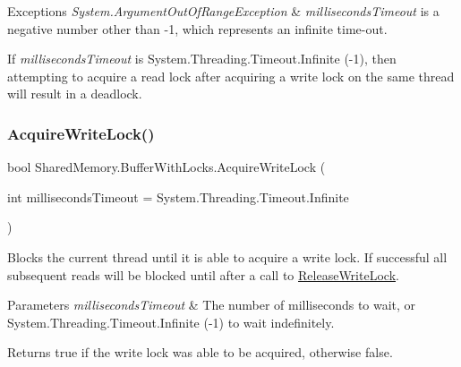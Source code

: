 \begin{DoxyExceptions}{Exceptions}
{\em System.\+Argument\+Out\+Of\+Range\+Exception} & {\itshape milliseconds\+Timeout}  is a negative number other than -\/1, which represents an infinite time-\/out.\\
\hline
\end{DoxyExceptions}


If {\itshape milliseconds\+Timeout}  is System.\+Threading.\+Timeout.\+Infinite (-\/1), then attempting to acquire a read lock after acquiring a write lock on the same thread will result in a deadlock.\mbox{\label{class_shared_memory_1_1_buffer_with_locks_a309b191c69586043c60362e401732940}} 
\subsubsection{\texorpdfstring{Acquire\+Write\+Lock()}{AcquireWriteLock()}}
{\footnotesize\ttfamily bool Shared\+Memory.\+Buffer\+With\+Locks.\+Acquire\+Write\+Lock (\begin{DoxyParamCaption}\item[{int}]{milliseconds\+Timeout = {\ttfamily System.Threading.Timeout.Infinite} }\end{DoxyParamCaption})\hspace{0.3cm}{\ttfamily [inline]}}



Blocks the current thread until it is able to acquire a write lock. If successful all subsequent reads will be blocked until after a call to \hyperlink{class_shared_memory_1_1_buffer_with_locks_a9032d217f1f869d62ea29b3a3ea3fb98}{Release\+Write\+Lock}. 


\begin{DoxyParams}{Parameters}
{\em milliseconds\+Timeout} & The number of milliseconds to wait, or System.\+Threading.\+Timeout.\+Infinite (-\/1) to wait indefinitely.\\
\hline
\end{DoxyParams}
\begin{DoxyReturn}{Returns}
true if the write lock was able to be acquired, otherwise false.
\end{DoxyReturn}

